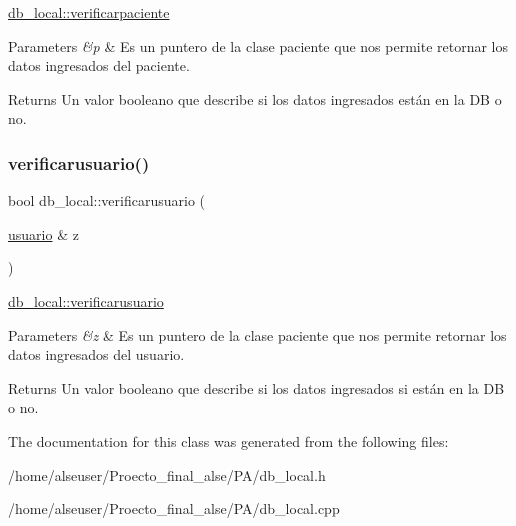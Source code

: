 \hyperlink{classdb__local_af39c3f536549485b9ec8e614f92870c1}{db\+\_\+local\+::verificarpaciente} 


\begin{DoxyParams}{Parameters}
{\em \&p} & Es un puntero de la clase paciente que nos permite retornar los datos ingresados del paciente. \\
\hline
\end{DoxyParams}
\begin{DoxyReturn}{Returns}
Un valor booleano que describe si los datos ingresados están en la DB o no. 
\end{DoxyReturn}
\mbox{\label{classdb__local_a54ef2e3aa44fcfb68f9dd02c64ae8421}} 
\subsubsection{\texorpdfstring{verificarusuario()}{verificarusuario()}}
{\footnotesize\ttfamily bool db\+\_\+local\+::verificarusuario (\begin{DoxyParamCaption}\item[{\hyperlink{classusuario}{usuario} \&}]{z }\end{DoxyParamCaption})}



\hyperlink{classdb__local_a54ef2e3aa44fcfb68f9dd02c64ae8421}{db\+\_\+local\+::verificarusuario} 


\begin{DoxyParams}{Parameters}
{\em \&z} & Es un puntero de la clase paciente que nos permite retornar los datos ingresados del usuario. \\
\hline
\end{DoxyParams}
\begin{DoxyReturn}{Returns}
Un valor booleano que describe si los datos ingresados si están en la DB o no. 
\end{DoxyReturn}


The documentation for this class was generated from the following files\+:\begin{DoxyCompactItemize}
\item 
/home/alseuser/\+Proecto\+\_\+final\+\_\+alse/\+P\+A/db\+\_\+local.\+h\item 
/home/alseuser/\+Proecto\+\_\+final\+\_\+alse/\+P\+A/db\+\_\+local.\+cpp\end{DoxyCompactItemize}
